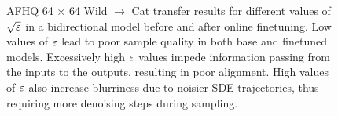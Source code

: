 \documentclass{article}
\begin{document}
\begin{figure}[htbp] 
    \centering 
    \hfill
    \hfill
    
    \caption{AFHQ 64 $\times$ 64 Wild $\rightarrow$ Cat transfer results for different values of $\sqrt{\varepsilon}$ in a bidirectional model before and after online finetuning. Low values of $\varepsilon$ lead to poor sample quality in both base and finetuned models. Excessively high $\varepsilon$ values impede information passing from the inputs to the outputs, resulting in poor alignment. High values of $\varepsilon$ also increase blurriness due to noisier SDE trajectories, thus requiring more denoising steps during sampling.} 
    \label{fig:afhq_sigma_sweep} 
\end{figure}
\end{document}
